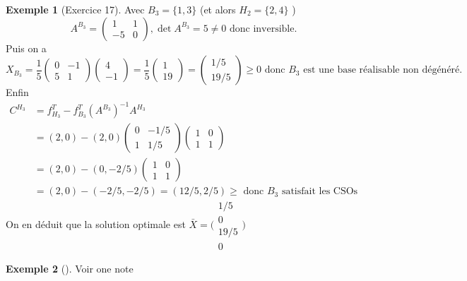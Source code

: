 \documentclass{article}
\theoremstyle{plain}%
\theoremstyle{definition}
\newtheorem{exmp}{Exemple}[section]
\theoremstyle{remark}
\begin{document}
\begin{exmp}[Exercice 17]
    Avec  $ B_3 = \{1,3\} $ (et alors $ H_2=\{2,4\} $ )
    \[
        A^{B_3} = \begin{pmatrix} 1 & 1 \\ -5 & 0\end{pmatrix}, \det A^{B_3} = 5 \neq 0 \text{ donc inversible}
    .\]
    Puis on a 
    \[
        X_{B_3} = \frac{1}{5}\begin{pmatrix}0 & -1 \\5 & 1 \end{pmatrix} \begin{pmatrix}4 \\-1 \end{pmatrix} = \frac{1}{5}\begin{pmatrix} 1 \\ 19 \end{pmatrix} = \begin{pmatrix} 1/5 \\ 19/5 \end{pmatrix} \geq 0 \text{ donc } B_3 \text{ est une base réalisable non dégénéré}
    .\]
    Enfin 
    \begin{align*}
        C^{H_3} &= f^T_{H_3} - f^T_{B_3} (A^{B_3})^{-1} A^{H_3} \\
                &= (2,0) - (2,0) \begin{pmatrix}
                    0 & -1/5 \\
                    1 & 1/5 
                \end{pmatrix} \begin{pmatrix}
                    1 & 0 \\
                    1 & 1
                \end{pmatrix} \\
                &= (2,0) - (0, -2/5)\begin{pmatrix}
                    1 & 0 \\  1 & 1
                \end{pmatrix} \\
                &= (2, 0) - (-2/5, -2/5) = (12/5, 2/5) \geq \text{ donc } B_3 \text{ satisfait les CSOs }
    \end{align*}
    On en déduit que la solution optimale est $ \bar{X} = \big(\begin{smallmatrix}
        1/5 \\
        0 \\ 19/5 \\ 0
    \end{smallmatrix}\big)$ 
\end{exmp}

\begin{exmp}[]
    Voir one note
\end{exmp}
\end{document}
